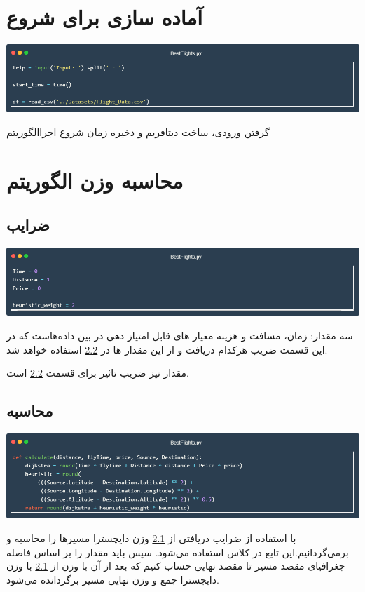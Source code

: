 \documentclass[12pt, dvipsnames, svgnames, x11names,]{article}
\begin{document}
			
	\section{آماده سازی برای شروع}

		{\includegraphics[width=14cm]{images/code01}} \par
		{\normalsize گرفتن ورودی، ‌ساخت دیتافریم و ذخیره زمان شروع اجراالگوریتم}
			
			
	\section{محاسبه وزن الگوریتم}
		
		\subsection{ضرایب} \label{weitghs}
				
			\includegraphics[width=14cm]{images/code02} \par
			{\normalsize 
				سه مقدار: زمان،‌ مسافت و هزینه معیار های قابل امتیاز دهی در بین  داده‌هاست که در این قسمت ضریب هرکدام دریافت و از این مقدار ها در \ref{calculate_func} استفاده خواهد شد.
				
				مقدار  نیز ضریب تاثیر  برای قسمت \ref{calculate_func} است.
			}
				
		\subsection{محاسبه} \label{calculate_func}
				
			\includegraphics[width=14cm]{images/code03} \par
			{\normalsize 
				با استفاده از ضرایب دریافتی از \ref{weitghs} وزن دایچسترا مسیرها را محاسبه و برمی‌گردانیم.این تابع در کلاس  استفاده می‌شود. سپس باید مقدار  را بر اساس فاصله جغرافیای مقصد مسیر تا مقصد نهایی حساب کنیم که بعد از آن با وزن  از \ref{weitghs} با وزن دایجسترا جمع و وزن نهایی مسیر برگردانده می‌شود.
				}
		
\end{document}
